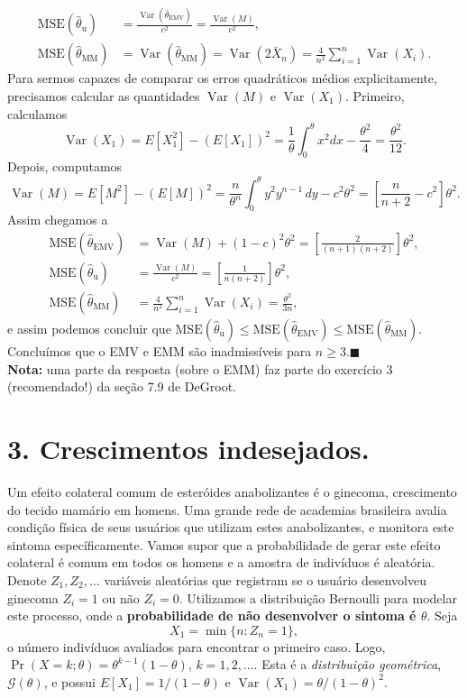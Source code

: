 \documentclass[a4paper,10pt, notitlepage]{report}
\newcommand{\pr}{\operatorname{Pr}} %
\newcommand{\vr}{\operatorname{Var}} %
\newcommand{\emv}{\hat{\theta}_{\text{EMV}}}
\begin{document}
{\begin{align*}
 \text{MSE}(\hat{\theta}_{\text{u}}) &= \frac{\vr(\emv)}{c^2}  =\frac{\vr(M)}{c^2},\\
  \text{MSE}(\hat{\theta}_{\text{MM}}) &= \vr(\hat{\theta}_{\text{MM}}) = \vr(2\bar{X}_n) =  \frac{4}{n^2} \sum_{i=1}^n \vr(X_i).
\end{align*}
Para sermos capazes de comparar os erros quadráticos médios explicitamente, precisamos calcular as quantidades $\vr(M)$ e $\vr(X_1)$.
Primeiro, calculamos
$$ \vr(X_1) = E[X_1^2] - \left(E[X_1]\right)^2 = \frac{1}{\theta}\int_{0}^\theta x^2 dx - \frac{\theta^2}{4} = \frac{\theta^2}{12}.$$
Depois, computamos
$$\vr(M) =  E[M^2] - \left(E[M]\right)^2 = \frac{n}{\theta^n}\int_{0}^\theta y^2y^{n-1}\,dy  -c^2\theta^2 = \left[\frac{n}{n +2}-c^2\right]\theta^2.$$ 
Assim chegamos a 
\begin{align*}
 \text{MSE}(\emv) &= \vr(M) + (1-c)^2\theta^2 = \left[\frac{2}{(n+1)(n+2)}\right]\theta^2,\\
 \text{MSE}(\hat{\theta}_{\text{u}}) &= \frac{\vr(M)}{c^2} = \left[\frac{1}{n(n+2)}\right]\theta^2,\\
  \text{MSE}(\hat{\theta}_{\text{MM}}) &= \frac{4}{n^2} \sum_{i=1}^n \vr(X_i) = \frac{\theta^2}{3n},
\end{align*}
e assim podemos concluir que $ \text{MSE}(\hat{\theta}_{\text{u}}) \leq \text{MSE}(\emv) \leq \text{MSE}(\hat{\theta}_{\text{MM}})$.
Concluímos que o EMV e EMM são inadmissíveis para $n\geq 3$.$\blacksquare$\\
\textbf{Nota:} uma parte da resposta (sobre o EMM) faz parte do exercício 3 (recomendado!) da seção 7.9 de DeGroot.
}

\section*{3. Crescimentos indesejados.}

Um efeito colateral comum de esteróides anabolizantes é o ginecoma, crescimento do tecido mamário em homens.
Uma grande rede de academias brasileira avalia condição física de seus usuários que utilizam estes anabolizantes, e monitora este sintoma específicamente.
Vamos supor que a probabilidade de gerar este efeito colateral é comum em todos os homens e a amostra de indivíduos é aleatória.
Denote $Z_1, Z_2, ...$ variáveis aleatórias que registram se o usuário desenvolveu ginecoma $Z_i = 1$ ou não $Z_i=0$.
Utilizamos a distribuição Bernoulli para modelar este processo, onde a \textbf{probabilidade de não desenvolver o sintoma é $\theta$}.
Seja 
    \[
    X_1 = \min\{n:Z_n=1\},
    \] o número indivíduos avaliados para encontrar o primeiro caso.
Logo, $\pr(X=k;\theta) = \theta^{k-1}(1-\theta)$, $k=1,2,...$.
Esta é a \textit{distribuição geométrica}, $\mathcal{G}(\theta)$, e possui $E[X_1] = 1/(1-\theta)$ e $\vr(X_1) = \theta/(1-\theta)^2$.
\end{document}
